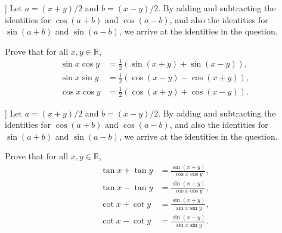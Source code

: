 \begin{solution}[name=Proof of Sine and Cosine Sum-to-Product]]
Let $a=(x+y)/2$ and $b=(x-y)/2$. By adding and subtracting the identities for $\cos(a+b)$ and $\cos(a-b)$, and also the identities for $\sin(a+b)$ and $\sin(a-b)$, we arrive at the identities in the question.
\end{solution}


\begin{tcolorbox}
    \begin{question}[name=Sine and Cosine Product-to-Sum]
    Prove that for all $x,y\in \mathbb R$,
    \begin{align}
        \sin x \cos y &= \frac{1}{2}\left(\sin(x+y) + \sin(x-y)\right), \label{id:sin-cos-product-to-sum} \\
        \sin x \sin y &= \frac{1}{2}\left(\cos(x-y) - \cos(x+y)\right), \label{id:sin-product-to-difference} \\
        \cos x \cos y &= \frac{1}{2}\left(\cos(x+y) + \cos(x-y)\right). \label{id:cos-product-to-sum}
    \end{align}
\end{question}
\end{tcolorbox}

\begin{solution}[name=Proof of Sine and Cosine Product-to-Sum]]
Let $a=(x+y)/2$ and $b=(x-y)/2$. By adding and subtracting the identities for $\cos(a+b)$ and $\cos(a-b)$, and also the identities for $\sin(a+b)$ and $\sin(a-b)$, we arrive at the identities in the question.
\end{solution}


\begin{tcolorbox}
    \begin{question}[name=Tangent and Cotangent Sum-to-Product]
    Prove that for all $x,y\in \mathbb R$,
    \begin{align}
        \tan x + \tan y &= \frac{\sin(x+y)}{\cos x \cos y}, \label{id:tan-sum-to-product} \\
        \tan x - \tan y &= \frac{\sin(x-y)}{\cos x \cos y}, \label{id:tan-difference-to-product} \\
        \cot x + \cot y &= \frac{\sin(x+y)}{\sin x \sin y}, \label{id:cot-sum-to-product} \\
        \cot x - \cot y &= \frac{\sin(x-y)}{\sin x \sin y}. \label{id:cot-difference-to-product} 
    \end{align}
\end{question}
\end{tcolorbox}


